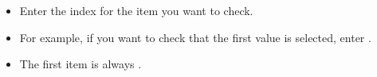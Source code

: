 \begin{itemize}
\item Enter the index for the item you want to check.
\item For example, if you want to check that the first value is selected, enter .
\item The first item is always . 

\end{itemize}

    
